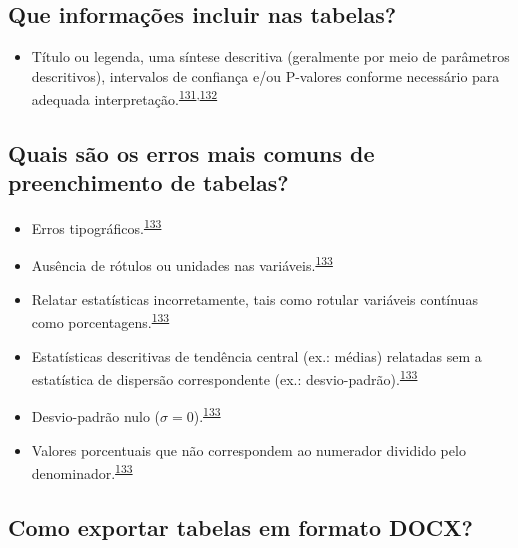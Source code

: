 \documentclass[
  a4paper,
]{book}
\providecommand{\tightlist}{%
  \setlength{\itemsep}{0pt}\setlength{\parskip}{0pt}}
\begin{document}
\hypertarget{que-informauxe7uxf5es-incluir-nas-tabelas}{%
\subsection{Que informações incluir nas tabelas?}\label{que-informauxe7uxf5es-incluir-nas-tabelas}}

\begin{itemize}
\tightlist
\item
  Título ou legenda, uma síntese descritiva (geralmente por meio de parâmetros descritivos), intervalos de confiança e/ou P-valores conforme necessário para adequada interpretação.\textsuperscript{\protect\hyperlink{ref-Inskip2017}{131},\protect\hyperlink{ref-Kwak2021}{132}}
\end{itemize}

\hypertarget{quais-suxe3o-os-erros-mais-comuns-de-preenchimento-de-tabelas}{%
\subsection{Quais são os erros mais comuns de preenchimento de tabelas?}\label{quais-suxe3o-os-erros-mais-comuns-de-preenchimento-de-tabelas}}

\begin{itemize}
\item
  Erros tipográficos.\textsuperscript{\protect\hyperlink{ref-barnett2023}{133}}
\item
  Ausência de rótulos ou unidades nas variáveis.\textsuperscript{\protect\hyperlink{ref-barnett2023}{133}}
\item
  Relatar estatísticas incorretamente, tais como rotular variáveis contínuas como porcentagens.\textsuperscript{\protect\hyperlink{ref-barnett2023}{133}}
\item
  Estatísticas descritivas de tendência central (ex.: médias) relatadas sem a estatística de dispersão correspondente (ex.: desvio-padrão).\textsuperscript{\protect\hyperlink{ref-barnett2023}{133}}
\item
  Desvio-padrão nulo (\(\sigma=0\)).\textsuperscript{\protect\hyperlink{ref-barnett2023}{133}}
\item
  Valores porcentuais que não correspondem ao numerador dividido pelo denominador.\textsuperscript{\protect\hyperlink{ref-barnett2023}{133}}
\end{itemize}

\hypertarget{como-exportar-tabelas-em-formato-docx}{%
\subsection{Como exportar tabelas em formato DOCX?}\label{como-exportar-tabelas-em-formato-docx}}
\end{document}
